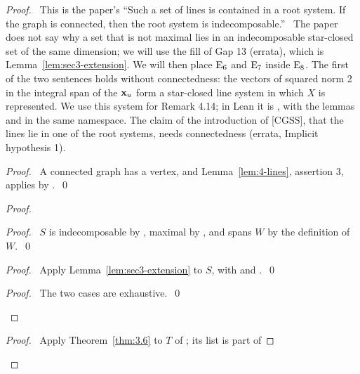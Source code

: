 \begin{proof}
 \pfsketch\ This is the paper's ``Such a set of lines is contained in a root system. If the
 graph is connected, then the root system is indecomposable.'' \repair\ The paper does not say
 why a set that is not maximal lies in an indecomposable star-closed set of the same dimension;
 we will use the fill of Gap 13 (errata), which is Lemma~\ref{lem:sec3-extension}. We will then
 place $\mathrm{E}_6$ and $\mathrm{E}_7$ inside $\mathrm{E}_8$. The first of the two sentences holds without
 connectedness: the vectors of squared norm 2 in the integral span of the ${\mathbf x}_u$ form a
 star-closed line system in which $X$ is represented. We use this system for Remark 4.14; in
 Lean it is , with the lemmas
  and  in the same
 namespace. The claim of the introduction of [CGSS], that the lines lie in one of the root
 systems, needs connectedness (errata, Implicit hypothesis 1).
 \begin{proof}\pf\ A connected graph has a vertex, and Lemma~\ref{lem:4-lines}, assertion 3,
  applies by .~\qed\end{proof}
 \begin{proof}
  \begin{proof}\pf\ $S$ is indecomposable by , maximal by , and
   spans $W$ by the definition of $W$.~\qed\end{proof}
  \begin{proof}\pf\ Apply Lemma~\ref{lem:sec3-extension} to $S$, with
    and .~\qed\end{proof}
  \qedstep
  \begin{proof}\pf\ The two cases are exhaustive.~\qed\end{proof}
 \end{proof}
 \begin{proof}\pf\ Apply Theorem~\ref{thm:3.6} to $T$ of ; its list is part of

\end{proof}
\end{proof}

